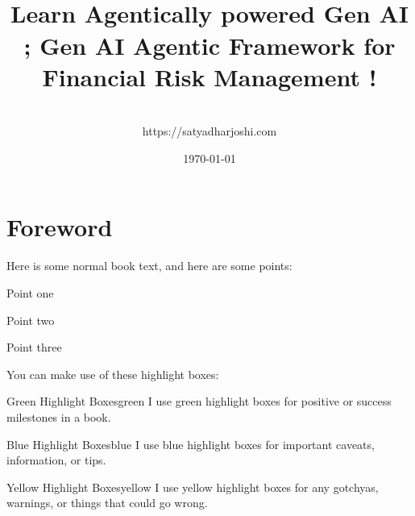\documentclass[a4paper,headinclude=on,footinclude=on,12pt,oneside]{scrbook}
\begin{document}
\title{\\\small{Learn Agentically powered Gen AI ;  
		Gen AI Agentic Framework for Financial Risk Management !}}
\author{
    \\https://satyadharjoshi.com
}
\date{\today}

\maketitle
\tableofcontents

\listoffigures
{}

\listoflistings
{}

\chapter*{Foreword}


Here is some normal book text, and here are some points:

\begin{arrows}
\item Point one
\item Point two
\item Point three
\end{arrows}


You can make use of these highlight boxes:

\begin{highlightBox}{Green Highlight Boxes}{green}{\greenCheck}
I use green highlight boxes for positive or success milestones in a book.
\end{highlightBox}

\begin{highlightBox}{Blue Highlight Boxes}{blue}{\information}
I use blue highlight boxes for important caveats, information, or tips.
\end{highlightBox}

\begin{highlightBox}{Yellow Highlight Boxes}{yellow}{\warning}
I use yellow highlight boxes for any gotchyas, warnings, or things that could go wrong.
\end{highlightBox}
\end{document}
